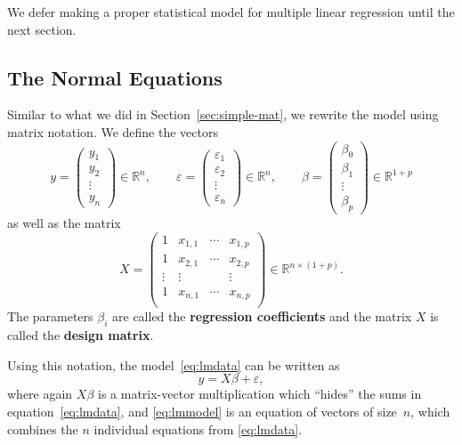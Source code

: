 \documentclass[
  a4paper,
]{article}
\theoremstyle{definition}
\theoremstyle{definition}
\theoremstyle{definition}
\theoremstyle{definition}
\theoremstyle{remark}
\begin{document}
We defer making a proper statistical model for multiple linear regression
until the next section.

\hypertarget{the-normal-equations}{%
\subsection{The Normal Equations}\label{the-normal-equations}}

Similar to what we did in Section~\ref{sec:simple-mat}, we rewrite
the model using matrix notation. We define the vectors
\begin{equation*}
  y = \begin{pmatrix}
    y_1 \\ y_2 \\ \vdots \\ y_n
  \end{pmatrix}
  \in \mathbb{R}^n,
  \qquad
  \varepsilon= \begin{pmatrix}
    \varepsilon_1 \\ \varepsilon_2 \\ \vdots \\ \varepsilon_n
  \end{pmatrix}
  \in \mathbb{R}^n,
  \qquad
  \beta = \begin{pmatrix}
    \beta_0 \\
    \beta_1 \\
    \vdots \\
    \beta_p
  \end{pmatrix}
  \in\mathbb{R}^{1+p}
\end{equation*}
as well as the matrix
\begin{equation*}
  X = \begin{pmatrix}
    1 & x_{1,1} & \cdots & x_{1,p} \\
    1 & x_{2,1} & \cdots & x_{2,p} \\
    \vdots & \vdots & & \vdots \\
    1 & x_{n,1} & \cdots & x_{n,p} \\
  \end{pmatrix}
  \in \mathbb{R}^{n\times (1+p)}.
\end{equation*}
The parameters \(\beta_i\) are called the \textbf{regression coefficients} and
the matrix \(X\) is called the \textbf{design matrix}.

Using this notation, the model~\eqref{eq:lmdata} can be written
as
\begin{equation}
  y = X \beta + \varepsilon,  \label{eq:lmmodel}
\end{equation}
where again \(X\beta\) is a matrix-vector multiplication which ``hides''
the sums in equation~\eqref{eq:lmdata}, and \eqref{eq:lmmodel}
is an equation of vectors of size~\(n\), which combines the \(n\)
individual equations from \eqref{eq:lmdata}.
\end{document}
